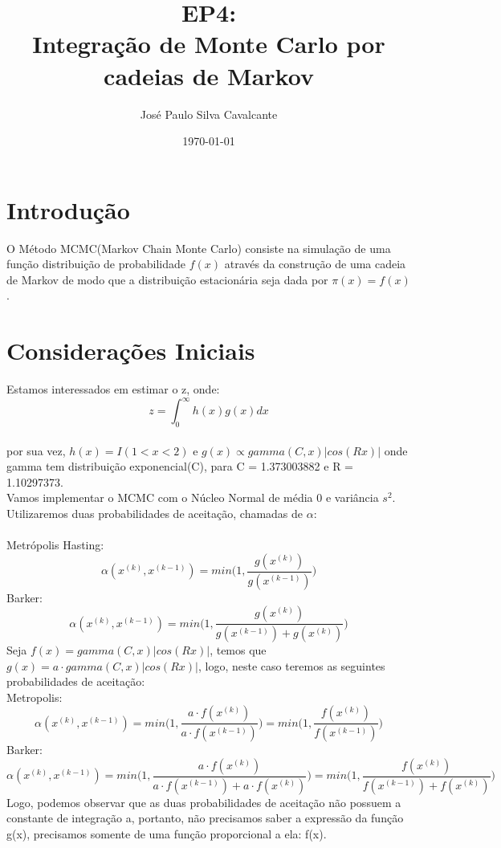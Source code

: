 \documentclass{article}
\title{EP4:\\ Integração de Monte Carlo por cadeias de Markov}
\author{José Paulo Silva Cavalcante}
\date{\today}
\begin{document}
\maketitle
\section{Introdução}
O Método MCMC(Markov Chain Monte Carlo) consiste na simulação de uma função distribuição de probabilidade $f(x)$ através da construção de uma cadeia de Markov de modo que a distribuição estacionária seja dada por $\pi(x) = f(x) $.
\section{Considerações Iniciais}

Estamos interessados em estimar o z, onde:\\

\begin{equation}
 z = \int_{0}^{\infty}h(x)g(x)dx
\end{equation}
\\

\noindent por sua vez,
$h(x)=I(1<x<2)$ e $g(x) \propto gamma(C,x)|cos(Rx)|$ onde gamma tem distribuição exponencial(C), para C = 1.373003882 e R = 1.10297373.\\
Vamos implementar o MCMC com o Núcleo Normal de média 0 e variância $s^2$.\\
Utilizaremos duas probabilidades de aceitação, chamadas de $\alpha$:\\\\
Metrópolis Hasting:\\
\begin{equation}
\alpha(x^{(k)},x^{(k-1)}) = min\Bigg(1,\frac{g(x^{(k)})}{g(x^{(k-1)})}\Bigg)
\end{equation}
Barker:
\begin{equation}
\alpha(x^{(k)},x^{(k-1)}) = min\Bigg(1,\frac{g(x^{(k)})}{g(x^{(k-1)})+g(x^{(k)})}\Bigg)
\end{equation}
Seja $f(x)= gamma(C,x)|cos(Rx)|$, temos que $g(x) = a\cdot gamma(C,x)|cos(Rx)|$, logo, neste caso teremos as seguintes probabilidades de aceitação:\\
Metropolis:
\begin{equation}
\alpha(x^{(k)},x^{(k-1)}) = min\Bigg(1,\frac{a\cdot f(x^{(k)})}{a\cdot f(x^{(k-1)})}\Bigg)=min\Bigg(1,\frac{f(x^{(k)})}{f(x^{(k-1)})}\Bigg)	
\end{equation}
Barker:
\begin{equation}
\alpha(x^{(k)},x^{(k-1)}) = min\Bigg(1,\frac{a\cdot f(x^{(k)})}{a\cdot f(x^{(k-1)})+a\cdot f(x^{(k)})}\Bigg)=min\Bigg(1,\frac{f(x^{(k)})}{f(x^{(k-1)})+f(x^{(k)})}\Bigg)	
\end{equation}
Logo, podemos observar que as duas probabilidades de aceitação não possuem a constante de integração a, portanto, não precisamos saber a expressão da função g(x), precisamos somente de uma função proporcional a ela: f(x).
\end{document}
